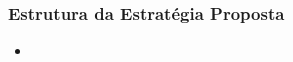 \begin{frame}
	\frametitle{Estrutura da Estratégia Proposta}
	\begin{itemize}
		\item 
	\end{itemize}
\end{frame}